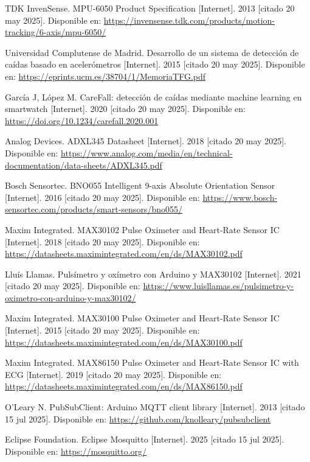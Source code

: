 \documentclass[12pt, a4paper]{article}
\begin{document}
\begin{thebibliography}{9}
	
	TDK InvenSense. MPU-6050 Product Specification [Internet]. 2013 [citado 20 may 2025]. Disponible en: \url{https://invensense.tdk.com/products/motion-tracking/6-axis/mpu-6050/}
	
	Universidad Complutense de Madrid. Desarrollo de un sistema de detección de caídas basado en acelerómetros [Internet]. 2015 [citado 20 may 2025]. Disponible en: \url{https://eprints.ucm.es/38704/1/MemoriaTFG.pdf}
	
	García J, López M. CareFall: detección de caídas mediante machine learning en smartwatch [Internet]. 2020 [citado 20 may 2025]. Disponible en: \url{https://doi.org/10.1234/carefall.2020.001}
	
	Analog Devices. ADXL345 Datasheet [Internet]. 2018 [citado 20 may 2025]. Disponible en: \url{https://www.analog.com/media/en/technical-documentation/data-sheets/ADXL345.pdf}
	
	Bosch Sensortec. BNO055 Intelligent 9-axis Absolute Orientation Sensor [Internet]. 2016 [citado 20 may 2025]. Disponible en: \url{https://www.bosch-sensortec.com/products/smart-sensors/bno055/}
	
	Maxim Integrated. MAX30102 Pulse Oximeter and Heart-Rate Sensor IC [Internet]. 2018 [citado 20 may 2025]. Disponible en: \url{https://datasheets.maximintegrated.com/en/ds/MAX30102.pdf}
	
	Lluís Llamas. Pulsímetro y oxímetro con Arduino y MAX30102 [Internet]. 2021 [citado 20 may 2025]. Disponible en: \url{https://www.luisllamas.es/pulsimetro-y-oximetro-con-arduino-y-max30102/}
	
	Maxim Integrated. MAX30100 Pulse Oximeter and Heart-Rate Sensor IC [Internet]. 2015 [citado 20 may 2025]. Disponible en: \url{https://datasheets.maximintegrated.com/en/ds/MAX30100.pdf}
	
	Maxim Integrated. MAX86150 Pulse Oximeter and Heart-Rate Sensor IC with ECG [Internet]. 2019 [citado 20 may 2025]. Disponible en: \url{https://datasheets.maximintegrated.com/en/ds/MAX86150.pdf}
	
	
	O’Leary N. PubSubClient: Arduino MQTT client library [Internet]. 2013 [citado 15 jul 2025]. Disponible en: \url{https://github.com/knolleary/pubsubclient}

	Eclipse Foundation. Eclipse Mosquitto [Internet]. 2025 [citado 15 jul 2025]. Disponible en: \url{https://mosquitto.org/}

	
\end{thebibliography}
\end{document}
